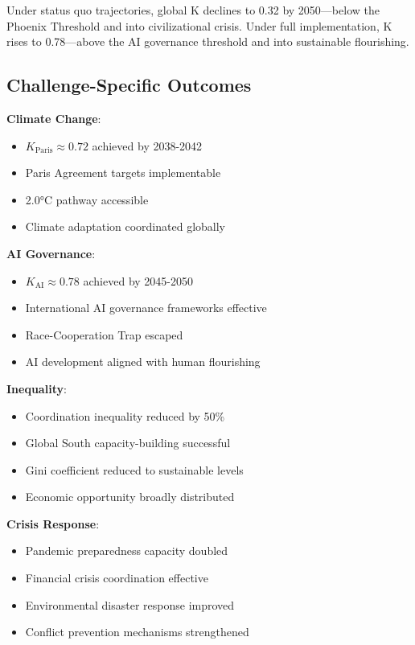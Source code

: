 \documentclass[12pt,letterpaper]{article}
\newcommand{\Kai}{K_{\text{AI}}}
\newcommand{\Kparis}{K_{\text{Paris}}}
\begin{document}
Under status quo trajectories, global K declines to 0.32 by 2050---below the Phoenix Threshold and into civilizational crisis. Under full implementation, K rises to 0.78---above the AI governance threshold and into sustainable flourishing.

\subsection{Challenge-Specific Outcomes}

\textbf{Climate Change}:
\begin{itemize}
    \item $\Kparis \approx 0.72$ achieved by 2038-2042
    \item Paris Agreement targets implementable
    \item 2.0°C pathway accessible
    \item Climate adaptation coordinated globally
\end{itemize}

\textbf{AI Governance}:
\begin{itemize}
    \item $\Kai \approx 0.78$ achieved by 2045-2050
    \item International AI governance frameworks effective
    \item Race-Cooperation Trap escaped
    \item AI development aligned with human flourishing
\end{itemize}

\textbf{Inequality}:
\begin{itemize}
    \item Coordination inequality reduced by 50\%
    \item Global South capacity-building successful
    \item Gini coefficient reduced to sustainable levels
    \item Economic opportunity broadly distributed
\end{itemize}

\textbf{Crisis Response}:
\begin{itemize}
    \item Pandemic preparedness capacity doubled
    \item Financial crisis coordination effective
    \item Environmental disaster response improved
    \item Conflict prevention mechanisms strengthened
\end{itemize}
\end{document}
